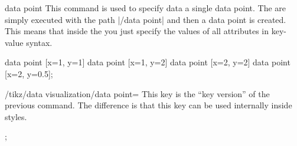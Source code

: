 \begin{datavisualizationoperation}{data point}{}
  This command is used to specify data a single data point. The
   are simply executed with the path |/data point| and
  then a data point is created. This means that inside the
   you just specify the values of all attributes in
  key-value syntax.
\begin{codeexample}[]
\tikz {}
  data point [x=1, y=1]    data point [x=1, y=2]
  data point [x=2, y=2]    data point [x=2, y=0.5];
\end{codeexample}
\end{datavisualizationoperation}

\begin{key}{/tikz/data visualization/data point=}
  This key is the ``key version'' of the previous command. The
  difference is that this key can be used internally inside styles.
\begin{codeexample}[]
\tikz \datavisualization
[ school book axes, visualize as line,
  horizontal=1,
  horizontal=2 ];
\end{codeexample}
\end{key}

